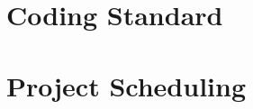 \documentclass{article}
\begin{document}
\section{Coding Standard}

\section{Project Scheduling}

\end{document}

